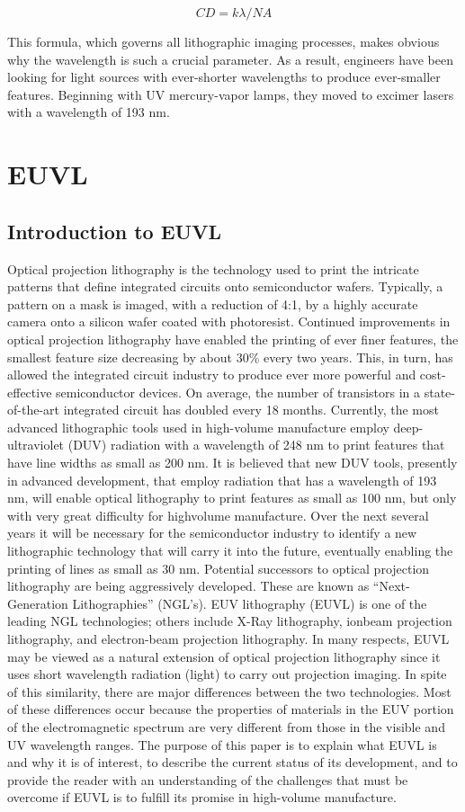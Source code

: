 \documentclass[12pt,a4paper]{report}
\begin{document}
$$CD = {k}{\lambda}/NA$$


This formula, which governs all lithographic imaging processes, makes 
obvious why the wavelength is such a crucial parameter. As a result, 
engineers have been looking for light sources with ever-shorter 
wavelengths to produce ever-smaller features. Beginning with UV
 mercury-vapor lamps, they moved to excimer lasers with a wavelength of 193 nm. 



\chapter{EUVL}
\section{Introduction to EUVL}

Optical projection lithography is the technology used to
print the intricate patterns that define integrated circuits
onto semiconductor wafers. Typically, a pattern on a
mask is imaged, with a reduction of 4:1, by a highly
accurate camera onto a silicon wafer coated with
photoresist. Continued improvements in optical
projection lithography have enabled the printing of ever
finer features, the smallest feature size decreasing by
about 30\% every two years. This, in turn, has allowed
the integrated circuit industry to produce ever more
powerful and cost-effective semiconductor devices. On
average, the number of transistors in a state-of-the-art
integrated circuit has doubled every 18 months.
Currently, the most advanced lithographic tools used in
high-volume manufacture employ deep-ultraviolet (DUV)
radiation with a wavelength of 248 nm to print features
that have line widths as small as 200 nm. It is believed
that new DUV tools, presently in advanced development,
that employ radiation that has a wavelength of 193 nm,
will enable optical lithography to print features as small
as 100 nm, but only with very great difficulty for highvolume manufacture. Over the next several years it will
be necessary for the semiconductor industry to identify a
new lithographic technology that will carry it into the
future, eventually enabling the printing of lines as small
as 30 nm. Potential successors to optical projection
lithography are being aggressively developed. These are
known as “Next-Generation Lithographies” (NGL's).
EUV lithography (EUVL) is one of the leading NGL
technologies; others include X-Ray lithography, ionbeam projection lithography, and electron-beam
projection lithography.
In many respects, EUVL may be viewed as a natural
extension of optical projection lithography since it uses
short wavelength radiation (light) to carry out projection
imaging. In spite of this similarity, there are major
differences between the two technologies. Most of these
differences occur because the properties of materials in
the EUV portion of the electromagnetic spectrum are
very different from those in the visible and UV
wavelength ranges. The purpose of this paper is to
explain what EUVL is and why it is of interest, to
describe the current status of its development, and to
provide the reader with an understanding of the
challenges that must be overcome if EUVL is to fulfill its
promise in high-volume manufacture.
\end{document}
